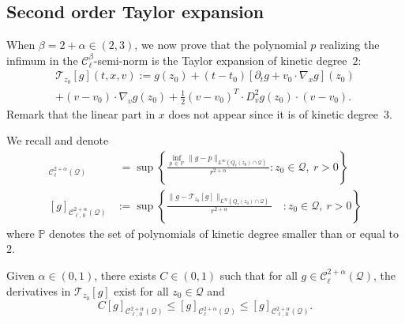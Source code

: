 \documentclass[AHL,Unicode,longabstracts,published]{cedram}
\newcommand{\bbP}{\mathbb{P}}
\newcommand{\cC}{\mathcal{C}}
\newcommand{\cT}{\mathcal{T}}
\newcommand{\cQ}{\mathcal{Q}}
\begin{document}
\subsection{Second order Taylor expansion}

When $\beta =2+\alpha \in (2,3)$, we now prove that the polynomial $p$ realizing the infimum in the $\cC_\ell^\beta$-semi-norm is the Taylor expansion of kinetic degree~$2$:
\begin{multline}\label{e:taylor}
\cT_{z_0}[g](t,x,v)
 := g(z_0) + (t-t_0) \left[\partial_t g + v_0
\cdot \nabla_x g \right](z_0)\\
+ (v-v_0) \cdot \nabla_v g(z_0) + \frac12 (v-v_0)^T \cdot D^2 _v g(z_0) \cdot (v-v_0).
\end{multline}
Remark that the linear part in $x$ does not appear since it is of kinetic degree~$3$.

We recall and denote
\begin{align*}
[g]_{\cC_\ell^{2+\alpha}(\cQ)} &\; = \sup \left\{ \frac{ \inf_{p\,\in\,\bbP}
\|g-p \|_{L^\infty\left(Q_r(z_0) \cap \cQ\right)}}{r^{2+\alpha}} : z_0 \in \cQ, \ r >0 \right\} \\
[g]_{\cC_{\ell,\,0}^{2+\alpha}(\cQ)} & := \sup \left\{\frac{\|g-\cT_{z_0}[g]
\|_{L^\infty\left(Q_r(z_0) \cap \cQ\right)}}{r^{2+\alpha}}\quad : z_0 \in \cQ, \ r >0 \right\}
\end{align*}
where $\bbP$ denotes the set of polynomials of kinetic degree smaller than or equal to $2$.


\begin{lemm}\label{lem:NN0}
Given $\alpha \in (0,1)$, there exists $C\in (0,1)$ such that for all $g \in \cC_\ell^{2+\alpha}(\cQ)$, the derivatives in $\cT_{z_0}[g]$ exist for all $z_0 \in \cQ$ and
\[
C [g]_{\cC_{\ell,\,0}^{2+\alpha}(\cQ)} \le [g]_{\cC_\ell^{2+\alpha}(\cQ)} \le [g]_{\cC_{\ell,\,0}^{2+\alpha}(\cQ)}.
\]
\end{lemm}
\end{document}
